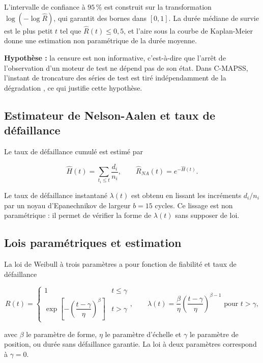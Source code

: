 L'intervalle de confiance à $95\,\%$ est construit sur la transformation $\log(-\log \hat R)$, qui garantit des bornes dans $[0, 1]$. La durée médiane de survie est le plus petit $t$ tel que $\hat R(t) \le 0{,}5$, et l'aire sous la courbe de Kaplan-Meier donne une estimation non paramétrique de la durée moyenne.

\textbf{Hypothèse :} la censure est non informative, c'est-à-dire que l'arrêt de l'observation d'un moteur de test ne dépend pas de son état. Dans C-MAPSS, l'instant de troncature des séries de test est tiré indépendamment de la dégradation \cite{saxena2008damage}, ce qui justifie cette hypothèse.

\subsection{Estimateur de Nelson-Aalen et taux de défaillance}

Le taux de défaillance cumulé est estimé par \cite{nelson1972,aalen1978}

\begin{equation}\label{eq:na}
\hat H(t) = \sum_{t_i \le t} \frac{d_i}{n_i}, \qquad \hat R_{NA}(t) = e^{-\hat H(t)} .
\end{equation}

Le taux de défaillance instantané $\lambda(t)$ est obtenu en lissant les incréments $d_i / n_i$ par un noyau d'Epanechnikov de largeur $b = 15$ cycles. Ce lissage est non paramétrique : il permet de vérifier la forme de $\lambda(t)$ sans supposer de loi.

\subsection{Lois paramétriques et estimation}

La loi de Weibull à trois paramètres \cite{weibull1951} a pour fonction de fiabilité et taux de défaillance

\begin{equation}\label{eq:weibull3}
R(t) = \begin{cases} 1 & t \le \gamma \\ \exp\!\left[-\left(\dfrac{t-\gamma}{\eta}\right)^{\beta}\right] & t > \gamma \end{cases}, \qquad \lambda(t) = \frac{\beta}{\eta}\left(\frac{t-\gamma}{\eta}\right)^{\beta-1} \text{ pour } t > \gamma,
\end{equation}

avec $\beta$ le paramètre de forme, $\eta$ le paramètre d'échelle et $\gamma$ le paramètre de position, ou durée sans défaillance garantie. La loi à deux paramètres correspond à $\gamma = 0$.

